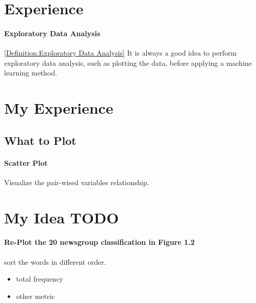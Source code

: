 \documentclass[11pt,a4paper]{article}
\begin{document}
\section{Experience}
\paragraph{Exploratory Data Analysis}\ref{Definition:Exploratory Data Analysis}
It is always a good idea to perform exploratory data analysis, 
such as plotting the data, before applying a machine learning method.

\section{My Experience}

\subsection{What to Plot}
\paragraph{Scatter Plot}
Visualize the pair-wised variables relationship.

\section{My Idea TODO}
\paragraph{Re-Plot the 20 newsgroup classification in Figure 1.2 }
sort the words in different order.
\begin{itemize}
 \item total frequency
 \item other metric
\end{itemize}





\end{document}
